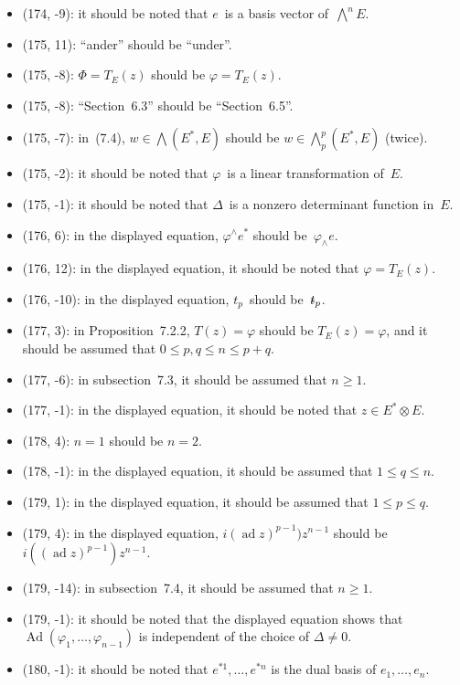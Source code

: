 \documentclass[letterpaper,12pt]{article}
\DeclareMathOperator{\ad}{ad}
\DeclareMathOperator{\Ad}{Ad}
\newcommand{\tprod}{\otimes}
\newcommand{\eprod}{\wedge}
\newcommand{\bigeprod}{\bigwedge}
\newcommand{\stroked}[1]{\mathrlap{\text{\kern0.05em-}}#1}
\newcommand{\unit}{\stroked{t}}
\begin{document}
\begin{itemize}
\item (174, -9): it should be noted that \(e\)~is a basis vector of~\(\bigeprod^n E\).
\item (175, 11): ``ander'' should be ``under''.
\item (175, -8): \(\Phi=T_E(z)\) should be \(\varphi=T_E(z)\).
\item (175, -8): ``Section~6.3'' should be ``Section~6.5''.
\item (175, -7): in~(7.4), \(w\in\bigeprod(E^*,E)\) should be \(w\in\bigeprod^p_p(E^*,E)\) (twice).
\item (175, -2): it should be noted that \(\varphi\)~is a linear transformation of~\(E\).
\item (175, -1): it should be noted that \(\Delta\)~is a nonzero determinant function in~\(E\).
\item (176, 6): in the displayed equation, \(\varphi^{\eprod}e^*\) should be~\(\varphi_{\eprod}e\).
\item (176, 12): in the displayed equation, it should be noted that \(\varphi=T_E(z)\).
\item (176, -10): in the displayed equation, \(t_p\)~should be~\(\unit_p\).
\item (177, 3): in Proposition~7.2.2, \(T(z)=\varphi\) should be \(T_E(z)=\varphi\), and it should be assumed that \(0\le p,q\le n\le p+q\).
\item (177, -6): in subsection~7.3, it should be assumed that \(n\ge 1\).
\item (177, -1): in the displayed equation, it should be noted that \(z\in E^*\tprod E\).
\item (178, 4): \(n=1\) should be \(n=2\).
\item (178, -1): in the displayed equation, it should be assumed that \(1\le q\le n\).
\item (179, 1): in the displayed equation, it should be assumed that \(1\le p\le q\).
\item (179, 4): in the displayed equation, \(i(\ad z)^{p-1})z^{n-1}\) should be \(i((\ad z)^{p-1})z^{n-1}\).
\item (179, -14): in subsection~7.4, it should be assumed that \(n\ge 1\).
\item (179, -1): it should be noted that the displayed equation shows that \(\Ad(\varphi_1,\ldots,\varphi_{n-1})\) is independent of the choice of \(\Delta\ne 0\).
\item (180, -1): it should be noted that \(e^{*1},\ldots,e^{*n}\) is the dual basis of \(e_1,\ldots,e_n\).

\end{itemize}
\end{document}
